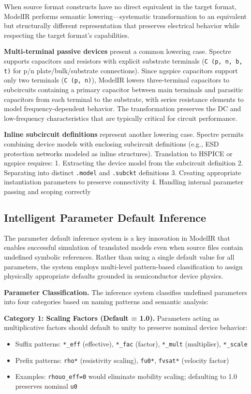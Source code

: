 \documentclass[10pt,twocolumn]{article}
\begin{document}
When source format constructs have no direct equivalent in the target format, ModelIR performs semantic lowering---systematic transformation to an equivalent but structurally different representation that preserves electrical behavior while respecting the target format's capabilities.

\textbf{Multi-terminal passive devices} present a common lowering case. Spectre supports capacitors and resistors with explicit substrate terminals (\texttt{C (p, n, b, t)} for p/n plate/bulk/substrate connections). Since ngspice capacitors support only two terminals (\texttt{C (p, n)}), ModelIR lowers three-terminal capacitors to subcircuits containing a primary capacitor between main terminals and parasitic capacitors from each terminal to the substrate, with series resistance elements to model frequency-dependent behavior. The transformation preserves the DC and low-frequency characteristics that are typically critical for circuit performance.

\textbf{Inline subcircuit definitions} represent another lowering case. Spectre permits combining device models with enclosing subcircuit definitions (e.g., ESD protection networks modeled as inline structures). Translation to HSPICE or ngspice requires:
1. Extracting the device model from the subcircuit definition
2. Separating into distinct \texttt{.model} and \texttt{.subckt} definitions
3. Creating appropriate instantiation parameters to preserve connectivity
4. Handling internal parameter passing and scoping correctly

\subsection{Intelligent Parameter Default Inference}
\label{sec:defaults}

The parameter default inference system is a key innovation in ModelIR that enables successful simulation of translated models even when source files contain undefined symbolic references. Rather than using a single default value for all parameters, the system employs multi-level pattern-based classification to assign physically appropriate defaults grounded in semiconductor device physics.

\textbf{Parameter Classification.} The inference system classifies undefined parameters into four categories based on naming patterns and semantic analysis:

\textbf{Category 1: Scaling Factors (Default = 1.0).} Parameters acting as multiplicative factors should default to unity to preserve nominal device behavior:
\begin{itemize}
\item Suffix patterns: \texttt{*\_eff} (effective), \texttt{*\_fac} (factor), \texttt{*\_mult} (multiplier), \texttt{*\_scale}
\item Prefix patterns: \texttt{rho*} (resistivity scaling), \texttt{fu0*}, \texttt{fvsat*} (velocity factor)
\item Examples: \texttt{rhouo\_eff=0} would eliminate mobility scaling; defaulting to 1.0 preserves nominal \texttt{u0}
\end{itemize}
\end{document}
